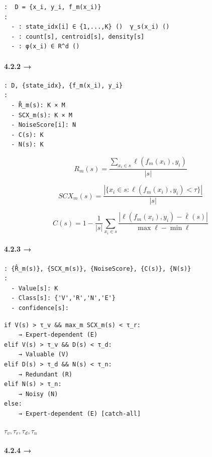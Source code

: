 \documentclass[
  12pt,
]{article}
\begin{document}
\begin{verbatim}
:  D = {x_i, y_i, f_m(x_i)}
: 
  - : state_idx[i] ∈ {1,...,K} ()  γ_s(x_i) ()
  - : count[s], centroid[s], density[s]
  - : φ(x_i) ∈ R^d ()
\end{verbatim}

\textbf{}

\paragraph{4.2.2  →
}\label{ux98ceux9669ux8bc4ux4f30ux6a21ux5757-ux6570ux636eux4ef7ux503cux8bc4ux4f30ux5668}

\begin{verbatim}
: D, {state_idx}, {f_m(x_i), y_i}
:
  - R̂_m(s): K × M 
  - SCX_m(s): K × M 
  - NoiseScore[i]: N 
  - C(s): K 
  - N(s): K 
\end{verbatim}

\textbf{}

\[R_m(s) = \frac{\sum_{x_i \in s} \ell(f_m(x_i), y_i)}{|s|}\]

\[SCX_m(s) = \frac{|\{x_i \in s : \ell(f_m(x_i), y_i) < \tau\}|}{|s|}\]

\[C(s) = 1 - \frac{1}{|s|} \sum_{x_i \in s} \frac{|\ell(f_m(x_i), y_i) - \bar{\ell}(s)|}{\max \ell - \min \ell}\]

\paragraph{4.2.3  →
}\label{ux6570ux636eux4ef7ux503cux8bc4ux4f30ux5668-ux52a8ux4f5cux51b3ux7b56ux5f15ux64ce}

\begin{verbatim}
: {R̂_m(s)}, {SCX_m(s)}, {NoiseScore}, {C(s)}, {N(s)}
:
  - Value[s]: K 
  - Class[s]: {'V','R','N','E'} 
  - confidence[s]: 
\end{verbatim}

\textbf{}

\begin{verbatim}
if V(s) > τ_v && max_m SCX_m(s) < τ_r:
    → Expert-dependent (E)
elif V(s) > τ_v && D(s) < τ_d:
    → Valuable (V)
elif D(s) > τ_d && N(s) < τ_n:
    → Redundant (R)
elif N(s) > τ_n:
    → Noisy (N)
else:
    → Expert-dependent (E) [catch-all]
\end{verbatim}

 \(\tau_v, \tau_r, \tau_d, \tau_n\) 

\paragraph{4.2.4  →
}\label{ux52a8ux4f5cux51b3ux7b56ux5f15ux64ce-ux6a21ux578bux66f4ux65b0ux6a21ux5757}
\end{document}
